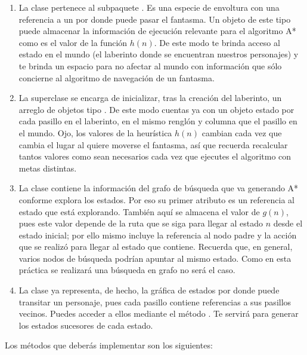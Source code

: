 \begin{enumerate}
 \item La clase  pertenece al subpaquete .  Es una especie de envoltura con una referencia a un  por donde puede pasar el fantasma.  Un objeto de este tipo puede almacenar la información de ejecución relevante para el algoritmo A* como es el valor de la función \(h(n)\).  De este modo te brinda acceso al estado en el mundo (el laberinto donde se encuentran nuestros personajes) y te brinda un espacio para no afectar al mundo con información que sólo concierne al algoritmo de navegación de un fantasma.
 
 \item La superclase  se encarga de inicializar, tras la creación del laberinto, un arreglo de objetos tipo .  De este modo cuentas ya con un objeto estado por cada pasillo en el laberinto, en el mismo renglón y columna que el pasillo en el mundo.  Ojo, los valores de la heurística $h(n)$ cambian cada vez que cambia el lugar al quiere moverse el fantasma, así que recuerda recalcular tantos valores como sean necesarios cada vez que ejecutes el algoritmo con metas distintas.
 
 \item La clase  contiene la información del grafo de búsqueda que va generando A* conforme explora los estados.  Por eso su primer atributo es un referencia al estado que está explorando.  También aquí se almacena el valor de $g(n)$, pues este valor depende de la ruta que se siga para llegar al estado $n$ desde el estado inicial; por ello mismo incluye la referencia al nodo padre y la acción que se realizó para llegar al estado que contiene.  Recuerda que, en general, varios nodos de búsqueda podrían apuntar al mismo estado.  Como en esta práctica se realizará una búsqueda en grafo no será el caso.
 
 \item La clase  ya representa, de hecho, la gráfica de estados por donde puede transitar un personaje, pues cada pasillo contiene referencias a sus pasillos vecinos.  Puedes acceder a ellos mediante el método .  Te servirá para generar los estados sucesores de cada estado.
\end{enumerate}

Los métodos que deberás implementar son los siguientes:

